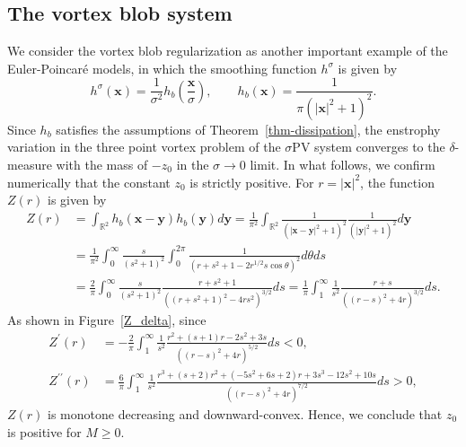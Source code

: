 \documentclass{article}
\theoremstyle{definition}
\begin{document}
\subsection{The vortex blob system}
We consider the vortex blob regularization as another important example of the Euler-Poincar\'{e} models, in which the smoothing function $h^\sigma$ is given by
\begin{equation*}
h^\sigma({\bm x}) = \frac{1}{\sigma^2} h_b \left( \frac{{\bm x}}{\sigma} \right), \qquad h_b({\bm x}) = \frac{1}{\pi (\vert{\bm x}\vert^2 + 1)^2}.
\end{equation*} 
Since $h_b$ satisfies the assumptions of Theorem~\ref{thm-dissipation}, the enstrophy variation   in the three point vortex problem of the $\sigma$PV system converges to the $\delta$-measure with  the mass of $-z_0$ in the $\sigma \rightarrow 0$ limit. In what follows, we confirm numerically that the constant $z_0$ is strictly positive. For $r = \vert{\bm x}\vert^2$, the function $Z(r)$ is given by
\begin{align*}
Z(r)  &= \int_{\mathbb{R}^2} h_b({\bm x} - {\bm y}) h_b({\bm y}) d{\bm y} = \frac{1}{\pi^2}\int_{\mathbb{R}^2} \frac{1}{\left( \vert{\bm x} - {\bm y}\vert^2 + 1 \right)^2} \frac{1}{\left( \vert{\bm y}\vert^2 + 1 \right)^2} d{\bm y} \\
&= \frac{1}{\pi^2} \int_0^\infty \frac{s}{(s^2 + 1)^2} \int_0^{2\pi} \frac{1}{\left( r + s^2 + 1 - 2 r^{1/2} s \cos{\theta} \right)^2}  d\theta ds \\
&= \frac{2}{\pi} \int_0^\infty \frac{s}{(s^2 + 1)^2} \frac{r + s^2 + 1}{\left( \left( r + s^2 + 1 \right)^2 - 4 r s^2 \right)^{3/2}} ds = \frac{1}{\pi} \int_1^\infty \frac{1}{s^2} \frac{r + s}{\left( \left( r - s \right)^2 + 4 r \right)^{3/2}} ds. 
\end{align*}
As shown in Figure~\ref{Z_delta}, since 
\begin{align*}
Z^\prime(r) &= - \frac{2}{\pi} \int_1^\infty \frac{1}{s^2} \frac{r^2 + (s + 1)r - 2 s^2 + 3s}{\left( \left( r - s \right)^2 + 4 r \right)^{5/2}} ds < 0, \\
Z^{\prime\prime}(r) &= \frac{6}{\pi} \int_1^\infty \frac{1}{s^2} \frac{ r^3 + (s + 2)r^2 + (-5s^2 +6s +2)r + 3s^3 -12s^2 + 10s}{\left( \left( r - s \right)^2 + 4 r \right)^{7/2}} ds >0,
\end{align*}
$Z(r)$ is monotone decreasing and downward-convex.  Hence, we conclude that $z_0$ is positive for $M \geq 0$.
\end{document}
